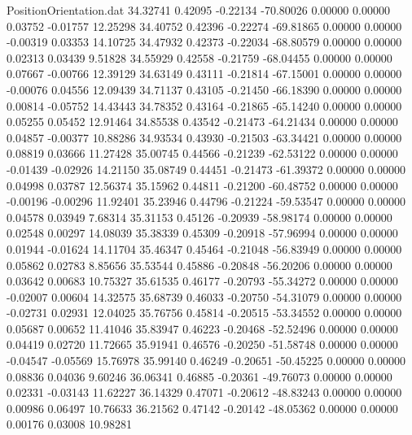 \begin{filecontents}{PositionOrientation.dat}
  34.32741    0.42095   -0.22134   -70.80026    0.00000    0.00000    0.03752   -0.01757   12.25298
  34.40752    0.42396   -0.22274   -69.81865    0.00000    0.00000   -0.00319    0.03353   14.10725
  34.47932    0.42373   -0.22034   -68.80579    0.00000    0.00000    0.02313    0.03439    9.51828
  34.55929    0.42558   -0.21759   -68.04455    0.00000    0.00000    0.07667   -0.00766   12.39129
  34.63149    0.43111   -0.21814   -67.15001    0.00000    0.00000   -0.00076    0.04556   12.09439
  34.71137    0.43105   -0.21450   -66.18390    0.00000    0.00000    0.00814   -0.05752   14.43443
  34.78352    0.43164   -0.21865   -65.14240    0.00000    0.00000    0.05255    0.05452   12.91464
  34.85538    0.43542   -0.21473   -64.21434    0.00000    0.00000    0.04857   -0.00377   10.88286
  34.93534    0.43930   -0.21503   -63.34421    0.00000    0.00000    0.08819    0.03666   11.27428
  35.00745    0.44566   -0.21239   -62.53122    0.00000    0.00000   -0.01439   -0.02926   14.21150
  35.08749    0.44451   -0.21473   -61.39372    0.00000    0.00000    0.04998    0.03787   12.56374
  35.15962    0.44811   -0.21200   -60.48752    0.00000    0.00000   -0.00196   -0.00296   11.92401
  35.23946    0.44796   -0.21224   -59.53547    0.00000    0.00000    0.04578    0.03949    7.68314
  35.31153    0.45126   -0.20939   -58.98174    0.00000    0.00000    0.02548    0.00297   14.08039
  35.38339    0.45309   -0.20918   -57.96994    0.00000    0.00000    0.01944   -0.01624   14.11704
  35.46347    0.45464   -0.21048   -56.83949    0.00000    0.00000    0.05862    0.02783    8.85656
  35.53544    0.45886   -0.20848   -56.20206    0.00000    0.00000    0.03642    0.00683   10.75327
  35.61535    0.46177   -0.20793   -55.34272    0.00000    0.00000   -0.02007    0.00604   14.32575
  35.68739    0.46033   -0.20750   -54.31079    0.00000    0.00000   -0.02731    0.02931   12.04025
  35.76756    0.45814   -0.20515   -53.34552    0.00000    0.00000    0.05687    0.00652   11.41046
  35.83947    0.46223   -0.20468   -52.52496    0.00000    0.00000    0.04419    0.02720   11.72665
  35.91941    0.46576   -0.20250   -51.58748    0.00000    0.00000   -0.04547   -0.05569   15.76978
  35.99140    0.46249   -0.20651   -50.45225    0.00000    0.00000    0.08836    0.04036    9.60246
  36.06341    0.46885   -0.20361   -49.76073    0.00000    0.00000    0.02331   -0.03143   11.62227
  36.14329    0.47071   -0.20612   -48.83243    0.00000    0.00000    0.00986    0.06497   10.76633
  36.21562    0.47142   -0.20142   -48.05362    0.00000    0.00000    0.00176    0.03008   10.98281

\end{filecontents}
